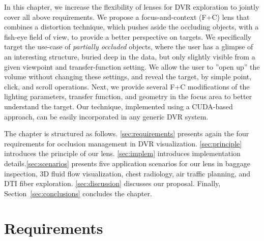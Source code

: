 In this chapter, we increase the flexibility of lenses for DVR exploration to jointly cover all above requirements. We propose a focus-and-context (F+C) lens that combines a distortion technique, which pushes aside the occluding objects, with a fish-eye field of view, to provide a better perspective on targets. We specifically target the use-case of \emph{partially occluded} objects, where the user has a glimpse of an interesting structure, buried deep in the data, but only slightly visible from a given viewpoint and transfer-function setting. We allow the user to ''open up'' the volume without changing these settings, and reveal the target, by simple point, click, and scroll operations. Next, we provide several F+C modifications of the lighting parameters, transfer function, and geometry in the focus area to better understand the target. Our technique, implemented using a CUDA-based approach, can be easily incorporated in any generic DVR system.

The chapter is structured as follows. \autoref{sec:requirements} presents again the four requirements for occlusion management in DVR visualization. \autoref{sec:principle} introduces the principle of our lens. \autoref{sec:implem} introduces implementation details.\autoref{sec:scenarios} presents five application scenarios for our lens in baggage inspection, 3D fluid flow visualization, chest radiology, air traffic planning, and DTI fiber exploration. \autoref{sec:discussion} discusses our proposal. Finally, Section~\autoref{sec:conclusions} concludes the chapter.

\section{Requirements}
\label{sec:requirements}

